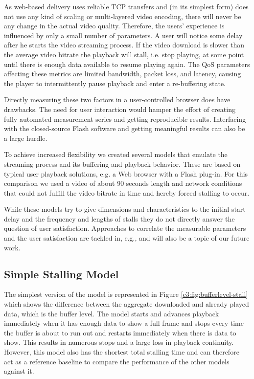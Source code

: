 As web-based delivery uses reliable TCP transfers and (in its simplest form) does not use any kind of scaling or multi-layered video encoding, there will never be any change in the actual video quality. Therefore, the users' experience is influenced by only a small number of parameters. A user will notice some delay after he starts the video streaming process. If the video download is slower than the average video bitrate the playback will stall, i.e. stop playing, at some point until there is enough data available to resume playing again.
The QoS parameters affecting these metrics are limited bandwidth, packet loss, and latency, causing the player to intermittently pause playback and enter a re-buffering state.

Directly measuring these two factors in a user-controlled browser does have drawbacks. The need for user interaction would hamper the effort of creating fully automated measurement series and getting reproducible results. Interfacing with the closed-source Flash software and getting meaningful results can also be a large hurdle.

To achieve increased flexibility we created several models that emulate the streaming process and its buffering and playback behavior. These are based on typical user playback solutions, e.g. a Web browser with a Flash plug-in. For this comparison we used a video of about 90 seconds length and network conditions that could not fulfill the video bitrate in time and hereby forced stalling to occur.

While these models try to give dimensions and characteristics to the initial start delay and the frequency and lengths of stalls they do not directly answer the question of user satisfaction. Approaches to correlate the  measurable parameters and the user satisfaction are tackled in, e.g., \cite{ketyko2010qoe, mokmeasuring, gustafsson2008measmmmquality} and will also be a topic of our future work.



\subsection{Simple Stalling Model}

The simplest version of the model is represented in Figure \ref{c3:fig:bufferlevel-stall} which shows the difference between the aggregate downloaded and already played data, which is the buffer level. The model starts and advances playback immediately when it has enough data to show a full frame and stops every time the buffer is about to run out and restarts immediately when there is data to show. This results in numerous stops and a large loss in playback continuity. However, this model also has the shortest total stalling time and can therefore act as a reference baseline to compare the performance of the other models against it.


